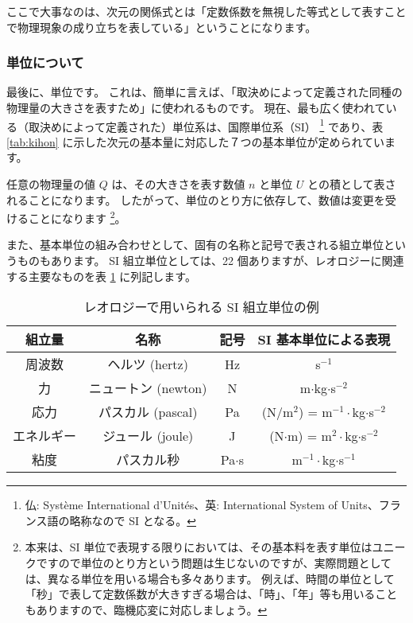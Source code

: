 \documentclass[uplatex,dvipdfmx,a4paper,11pt]{jsarticle}
\begin{document}
ここで大事なのは、次元の関係式とは「定数係数を無視した等式として表すことで物理現象の成り立ちを表している」ということになります。

\subsubsection{単位について}
最後に、単位です。
これは、簡単に言えば、「取決めによって定義された同種の物理量の大きさを表すため」に使われるものです。
現在、最も広く使われている（取決めによって定義された）単位系は、国際単位系（SI）
\footnote{仏: Syst\`eme International d'Unit\'es、英: International System of Units、フランス語の略称なので SI となる。}
であり、表 \ref{tab:kihon} に示した次元の基本量に対応した７つの基本単位が定められています。

任意の物理量の値 $Q$ は、その大きさを表す数値 $n$ と単位 $U$ との積として表されることになります。
したがって、単位のとり方に依存して、数値は変更を受けることになります
\footnote{
	本来は、SI 単位で表現する限りにおいては、その基本料を表す単位はユニークですので単位のとり方という問題は生じないのですが、実際問題としては、異なる単位を用いる場合も多々あります。
	例えば、時間の単位として「秒」で表して定数係数が大きすぎる場合は、「時」、「年」等も用いることもありますので、臨機応変に対応しましょう。
}。

また、基本単位の組み合わせとして、固有の名称と記号で表される組立単位というものもあります。
SI 組立単位としては、22 個ありますが、レオロジーに関連する主要なものを表 \ref{tab:kumitate} に列記します。
\begin{table}[htb]
	\begin{center}
		\caption{レオロジーで用いられる SI 組立単位の例}
		\label{tab:kumitate}
		\begin{tabular}{|c|c||c|c|} \hline
			組立量 		& 名称					& 記号		& SI 基本単位による表現 	\\ \hline \hline
			周波数		& ヘルツ (hertz)		& Hz		&  s$^{-1}$ 					\\ \hline
			力\index{ちから@力}			& ニュートン (newton)	& N 		& m$\cdot$kg$\cdot$s$^{-2}$ 	\\ \hline
			応力\index{おうりょく@応力}		& パスカル (pascal)		& Pa 		& (N/m$^2$) = m$^{-1}\cdot$kg$\cdot$s$^{-2}$ \\ \hline
			エネルギー	& ジュール (joule)		& J 		& (N$\cdot$m) = m$^{2}\cdot$kg$\cdot$s$^{-2}$ \\ \hline
			粘度\index{ねんど@粘度}		& パスカル秒			& Pa$\cdot$s & m$^{-1}\cdot$kg$\cdot$s$^{-1}$ \\ \hline
		\end{tabular}
	\end{center}
\end{table}
\end{document}
